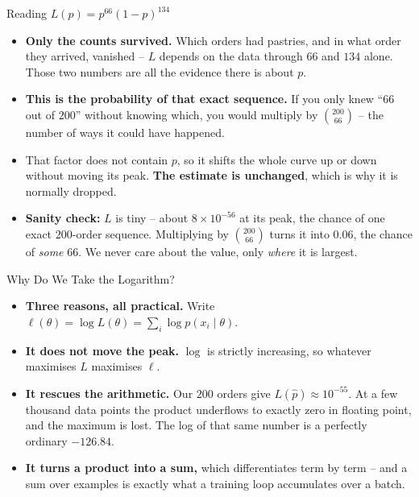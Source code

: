 \begin{frame}{Reading $L(p) = p^{66}(1-p)^{134}$}
\begin{itemize}
  \item \textbf{Only the counts survived.} Which orders had pastries, and in what order they arrived, vanished -- $L$ depends on the data through $66$ and $134$ alone. Those two numbers are all the evidence there is about $p$.
  \pause
  \item \textbf{This is the probability of that exact sequence.} If you only knew ``$66$ out of $200$'' without knowing which, you would multiply by $\binom{200}{66}$ -- the number of ways it could have happened.
  \pause
  \item That factor does not contain $p$, so it shifts the whole curve up or down without moving its peak. \textbf{The estimate is unchanged}, which is why it is normally dropped.
  \pause
  \item \textbf{Sanity check:} $L$ is tiny -- about $8 \times 10^{-56}$ at its peak, the chance of one exact $200$-order sequence. Multiplying by $\binom{200}{66}$ turns it into $0.06$, the chance of \emph{some} $66$. We never care about the value, only \emph{where} it is largest.
\end{itemize}
\end{frame}

\begin{frame}{Why Do We Take the Logarithm?}
\begin{itemize}
  \item \textbf{Three reasons, all practical.} Write $\ell(\theta) = \log L(\theta) = \sum_i \log p(x_i \mid \theta)$.
  \pause
  \item \textbf{It does not move the peak.} $\log$ is strictly increasing, so whatever maximises $L$ maximises $\ell$.
  \pause
  \item \textbf{It rescues the arithmetic.} Our $200$ orders give $L(\hat{p}) \approx 10^{-55}$. At a few thousand data points the product underflows to exactly zero in floating point, and the maximum is lost. The log of that same number is a perfectly ordinary $-126.84$.
  \pause
  \item \textbf{It turns a product into a sum,} which differentiates term by term -- and a sum over examples is exactly what a training loop accumulates over a batch.
\end{itemize}
\end{frame}

